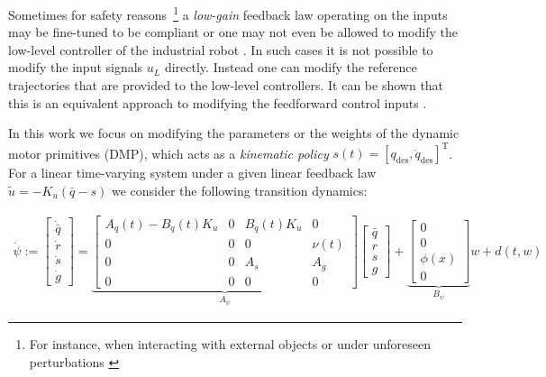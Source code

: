 \documentclass[10pt,a4paper]{article}
\newcommand{\joint}{q} %
\newcommand{\state}{\bar{\joint}} %
\newcommand{\dmp}{s} %
\newcommand{\traj}{r} %
\newcommand{\linDist}{d} %
\newcommand{\sysInput}{u} %
\newcommand{\linInput}{\tilde{u}} %
\newcommand{\fullvec}{\psi} %
\newcommand{\phase}{x} %
\newcommand{\weights}{w} %
\newcommand{\basis}{\phi} %
\begin{document}
Sometimes for safety reasons~\footnote{For instance, when interacting with external objects or under unforeseen perturbations \cite{Schaal07}} a \emph{low-gain} feedback law operating on the inputs may be fine-tuned to be compliant or one may not even be allowed to modify the low-level controller of the industrial robot \cite{Longman2000}. In such cases it is not possible to modify the input signals $\sysInput_L$ directly. Instead one can modify the reference trajectories that are provided to the low-level controllers. It can be shown that this is an equivalent approach to modifying the feedforward control inputs \cite{Bristow06}.

In this work we focus on modifying the parameters or the weights of the dynamic motor primitives (DMP), which acts as a \emph{kinematic policy} $\dmp(t) = [\joint_{\text{des}},\dot{\joint}_{\text{des}}]^{\mathrm{T}}$. For a linear time-varying system under a given linear feedback law $\linInput = -K_u(\state - \dmp)$ we consider the following transition dynamics:

\begin{equation}
\begin{aligned}
 \dot{\fullvec} := 
 \begin{bmatrix}
  \dot{\state} \\
  \dot{\traj} \\
  \dot{\dmp} \\
  \dot{g}
 \end{bmatrix} = 
 \underbrace{\begin{bmatrix}
  A_q(t) - B_q(t)K_u & 0 & B_q(t)K_u & 0 \\
  0 & 0 & 0 & \nu(t) \\
  0  & 0  & A_s & A_g  \\
  0 & 0 & 0 & 0
 \end{bmatrix}}_{A_{\fullvec}}
 \begin{bmatrix}
   \state \\
   \traj \\
   \dmp \\
   g
  \end{bmatrix} +
  \underbrace{\begin{bmatrix}
    0 \\
    0 \\
    \basis(\phase) \\
    0
   \end{bmatrix}}_{B_{\fullvec}} \weights + \linDist(t,\weights)
\end{aligned}
\label{fullTransition}
\end{equation}
\end{document}
